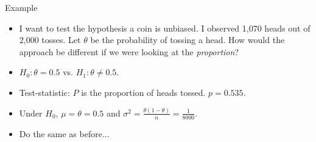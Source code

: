 \documentclass[10pt, handout, xcolor=table]{beamer}
\begin{document}
\begin{frame}{Example}
\begin{itemize}
\setlength{\itemsep}{10pt}
\item I want to test the hypothesis a coin is unbiased. I observed 1,070 heads out of 2,000 tosses. Let $\theta$ be the probability of tossing a head. How would the approach be different if we were looking at the \textit{proportion}?
\item<2->[Ans:] \color{red} $H_0: \theta = 0.5$ vs. $H_1: \theta \neq 0.5$.
\item<2->[] \color{red} Test-statistic: $P$ is the proportion of heads tossed. $p = 0.535$.
\item<2->[] \color{red} Under $H_0$, $\mu = \theta = 0.5$ and $\sigma^2 = \frac{\theta(1-\theta)}{n} = \frac{1}{8000}$.
\item<2->[] \color{red} Do the same as before...
\end{itemize}
\end{frame}
\end{document}
